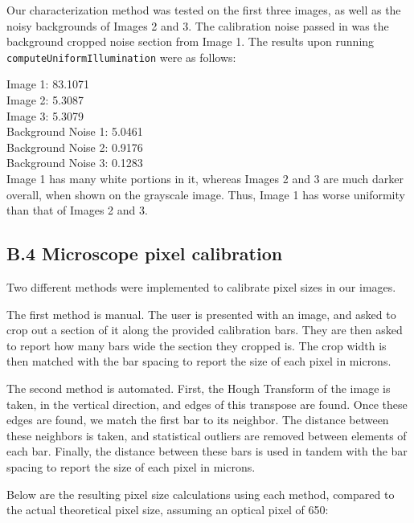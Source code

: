 \documentclass{article}
\begin{document}
Our characterization method was tested on the first three images, as well as the noisy backgrounds of Images 2 and 3. The calibration noise passed in was the background cropped noise section from Image 1. The results upon running \texttt{computeUniformIllumination} were as follows:

Image 1: 83.1071\\
Image 2: 5.3087\\
Image 3: 5.3079\\
Background Noise 1: 5.0461\\
Background Noise 2: 0.9176\\
Background Noise 3: 0.1283\\

Image 1 has many white portions in it, whereas Images 2 and 3 are much darker overall, when shown on the grayscale image. Thus, Image 1 has worse uniformity than that of Images 2 and 3.\\








\pagebreak
\subsection*{B.4 Microscope pixel calibration}
 
Two different methods were implemented to calibrate pixel sizes in our images.

The first method is manual. The user is presented with an image, and asked to crop out a section of it along the provided calibration bars. They are then asked to report how many bars wide the section they cropped is. The crop width is then matched with the bar spacing to report the size of each pixel in microns.

The second method is automated. First, the Hough Transform of the image is taken, in the vertical direction, and edges of this transpose are found. Once these edges are found, we match the first bar to its neighbor. The distance between these neighbors is taken, and statistical outliers are removed between elements of each bar. Finally, the distance between these bars is used in tandem with the bar spacing to report the size of each pixel in microns.

Below are the resulting pixel size calculations using each method, compared to the actual theoretical pixel size, assuming an optical pixel of \unit{650}{\nano\meter}:
\end{document}
